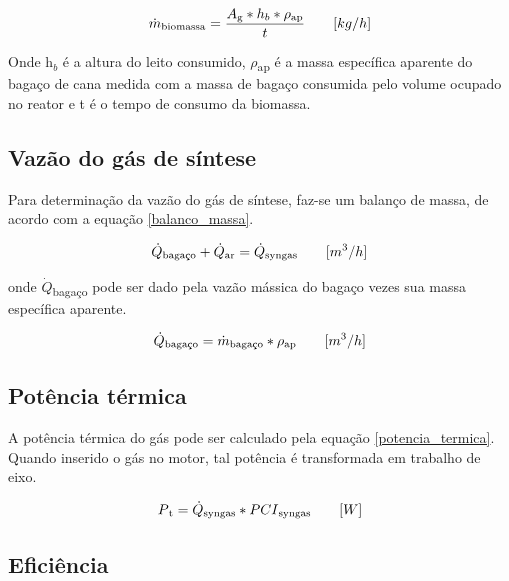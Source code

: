\begin{equation} \label{vazao_biomassa_PCI}
\dot{m}\textsubscript{biomassa} = \frac{A\textsubscript{g} * h_b * \rho\textsubscript{ap}}{t} \qquad [kg/h]
\end{equation}

Onde
h$_b$ é a altura do leito consumido,
$\rho$\textsubscript{ap} é a massa específica aparente do bagaço de cana medida com a massa de bagaço consumida pelo volume ocupado no reator e
t é o tempo de consumo da biomassa.

\subsection{Vazão do gás de síntese}

Para determinação da vazão do gás de síntese, faz-se um balanço de massa, de acordo com a equação \ref{balanco_massa}.

\begin{equation}\label{balanco_massa}
	\dot{Q}\textsubscript{bagaço} + \dot{Q}\textsubscript{ar} = \dot{Q}\textsubscript{syngas}\qquad [m^3/h]
\end{equation}

onde $\dot{Q}$\textsubscript{bagaço} pode ser dado pela vazão mássica do bagaço vezes sua massa específica aparente.

\begin{equation} \label{qdot_bagaco}
	\dot{Q}\textsubscript{bagaço} = \dot{m}\textsubscript{bagaço} * \rho\textsubscript{ap} \qquad [m^3/h]
\end{equation}



\subsection{Potência térmica}

A potência térmica do gás pode ser calculado pela equação \ref{potencia_termica}. Quando inserido o gás no motor, tal potência é transformada em trabalho de eixo.

\begin{equation} \label{potencia_termica}
P\textsubscript{t} = \dot{Q}\textsubscript{syngas} * PCI\textsubscript{syngas} \quad\quad  [W]
\end{equation}

\subsection{Eficiência}

